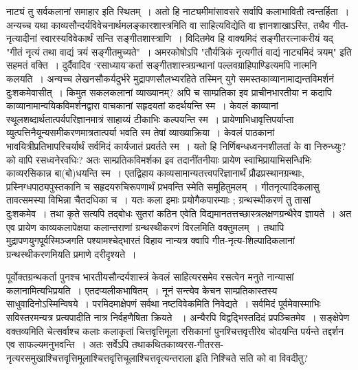 {\dev नाट्यं तु सर्वकलानां समाहार इति स्थितम्~। अतो हि नाट्यमीमांसावसरे सर्वापि कलाभाविती त्वन्तर्हिता~। अन्यच्च यथा काव्यसौन्दर्यविवेचनार्थमलङ्कारशास्त्रमिति वा साहित्यविद्येति वा ज्ञानशाखाऽस्ति, तथैव गीत-नृत्यादीनां स्वारस्यविवेकार्थं सन्ति सङ्गीतशास्त्राणि~। विदितमेव हि वाक्यमिदं सङ्गीतरत्नाकरीयं यद् "गीतं नृत्यं तथा वाद्यं त्रयं सङ्गीतमुच्यते"~। अमरकोषोऽपि "तौर्यत्रिकं नृत्यगीतं वाद्यं नाट्यमिदं त्रयम्" इति सहमतं वक्ति~। दुर्दैवादिव ‘रसाध्याय’कर्ता सङ्गीतशास्त्रग्रन्थानां पल्लवग्राहिपाण्डित्यमपि नात्मनि कलयति~। अन्यच्च लेखनसौकर्यदुर्भरे मुद्रापणसौलभ्यरहिते तस्मिन् युगे समस्तकाव्यानामाद्यन्तविमर्शनं दुःशकमेवासीत्~। किमुत सकलकलानां व्याख्यानम्? अपि च साम्प्रतिका इव प्राचीनभारतीया न कदापि काव्यानामा\-न्वयिकविमर्शनद्वारा वाचकानां सहृदयतां कदर्थयन्ति स्म~। केवलं काव्यानां स्थूलशब्दार्थता\-त्पर्यपरिज्ञानमात्रं साहाय्यं टीकाभिः कल्पयन्ति स्म~। प्रायेणाभिधावृत्तिपर्याप्ता व्युत्पत्तिनैयून्य\-समीकरणमात्रतात्पर्या भवति स्म तेषां व्याख्याक्रिया~। केवलं पाठकानां भावयित्रीप्रतिभापरि\-चर्यार्थं सर्वमिदं कार्यजातं प्रवर्तते स्म~। यतो हि निर्णिबन्धध्वननशीलतां के वा निरुन्ध्युः? को वापि रसध्वनेरवधिः? अतः साम्प्रतिकविमर्शका इव तदानींतनीयाः प्रायेण स्वाभिप्रायाभि\-सन्धिभिः काव्यरसिकान्न बा(बो)धयन्ति स्म~। एतद्विहाय काव्यसामान्यतत्त्वपरिज्ञानार्थं प्रौढप्रस्थानग्रन्थाः, प्रस्निग्धपाठ्यपुस्तकानि च सहृदयरुचिरूपणार्थं प्रभवन्ति स्मेति समूहितुमलम्~। गीतनृत्यादिकलासु तावत्समस्या विभिन्ना चैतदधिका च~। यतः कला इमाः प्रयोगैकपारम्याः ; ग्रन्थस्थीकरणं तु तासां दुःशकमेव~। तथा कृते सत्यपि तद्बोधः सुतरां कठिन एवेति विद्यमानतत्तच्छास्त्रलक्षणग्रन्थैरेव ज्ञायते~। अत एव प्रायेण काव्यकलापेक्षया कलान्तराणां ग्रन्थस्थीकरणं विरलमिति वक्तुमलम्~। तथापि मुद्रापणयुगपूर्वस्मिञ्जगति पश्यामश्चेद्भारतं विहाय नान्यत्र क्वापि गीत-नृत्य-शिल्पादिकलानां ग्रन्थस्थीकरणमियति प्रमाणे दरीदृश्यते~।}

{\dev पूर्वोक्तग्रन्थकर्ता पुनश्च भारतीयसौन्दर्यशास्त्रं केवलं साहित्यरसमेव रसत्वेन मनुते}  {\dev नान्यासां कलानामित्यभिप्रयति~। एतदप्यलीकभाषितम्~। नूनं सन्त्येव केचन साम्प्रतिकास्तस्य साधु\-वादिनोऽस्मिन्विषये~। परमिदमाक्षेपणं सर्वथा नष्टविवेकमिति निवेद्यते~। सर्वमिदं पूर्वमेवा\-स्माभिः सविस्तरमन्यत्र प्रत्यपादीति नात्र निर्वहणैषिता क्रियते} {\dev~। अन्यैरपि विद्वद्भिस्तदिदं प्रपञ्चितमेव~। सङ्क्षेपेण वक्तव्यमिति चेत्सर्वाश्च कलाः कला\-कृतां चित्तवृत्तिमूला रसिकानां पुनश्चित्तवृत्तीरेव चोदयन्ति पर्यन्ते तद्दर्शन एव साफल्यमनु\-भवन्ति~। अतः सर्वेऽपि तथाकथित\-काव्यरस-गीतरस-नृत्यरसमुखाश्चित्तवृत्तिमूलाश्चित्तवृत्ति\-चूलाश्चित्तवृत्यन्तराला इति निश्चिते सति को वा विवदीतु?}

